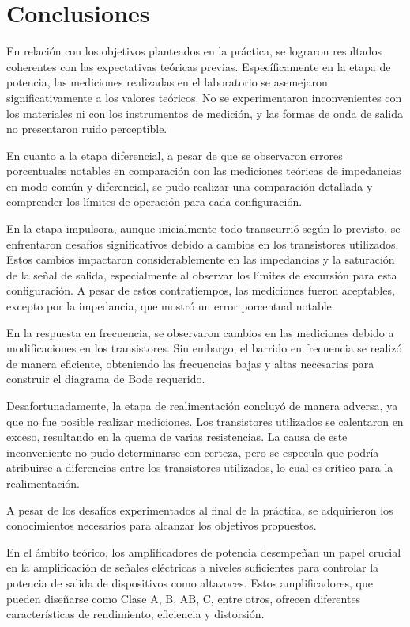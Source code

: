 
\section{Conclusiones}

En relación con los objetivos planteados en la práctica, se lograron resultados coherentes con las expectativas teóricas previas. Específicamente en la etapa de potencia, las mediciones realizadas en el laboratorio se asemejaron significativamente a los valores teóricos. No se experimentaron inconvenientes con los materiales ni con los instrumentos de medición, y las formas de onda de salida no presentaron ruido perceptible.

En cuanto a la etapa diferencial, a pesar de que se observaron errores porcentuales notables en comparación con las mediciones teóricas de impedancias en modo común y diferencial, se pudo realizar una comparación detallada y comprender los límites de operación para cada configuración.

En la etapa impulsora, aunque inicialmente todo transcurrió según lo previsto, se enfrentaron desafíos significativos debido a cambios en los transistores utilizados. Estos cambios impactaron considerablemente en las impedancias y la saturación de la señal de salida, especialmente al observar los límites de excursión para esta configuración. A pesar de estos contratiempos, las mediciones fueron aceptables, excepto por la impedancia, que mostró un error porcentual notable.

En la respuesta en frecuencia, se observaron cambios en las mediciones debido a modificaciones en los transistores. Sin embargo, el barrido en frecuencia se realizó de manera eficiente, obteniendo las frecuencias bajas y altas necesarias para construir el diagrama de Bode requerido.

Desafortunadamente, la etapa de realimentación concluyó de manera adversa, ya que no fue posible realizar mediciones. Los transistores utilizados se calentaron en exceso, resultando en la quema de varias resistencias. La causa de este inconveniente no pudo determinarse con certeza, pero se especula que podría atribuirse a diferencias entre los transistores utilizados, lo cual es crítico para la realimentación.

A pesar de los desafíos experimentados al final de la práctica, se adquirieron los conocimientos necesarios para alcanzar los objetivos propuestos.

En el ámbito teórico, los amplificadores de potencia desempeñan un papel crucial en la amplificación de señales eléctricas a niveles suficientes para controlar la potencia de salida de dispositivos como altavoces. Estos amplificadores, que pueden diseñarse como Clase A, B, AB, C, entre otros, ofrecen diferentes características de rendimiento, eficiencia y distorsión.

